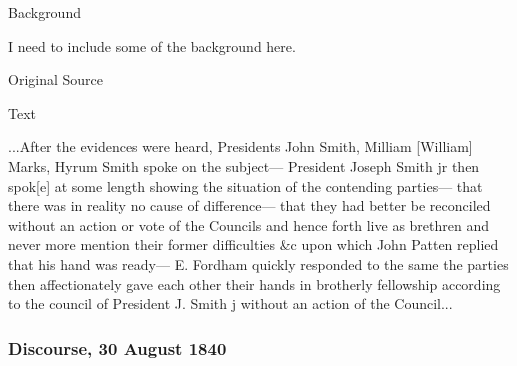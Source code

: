 			\begin{description}
				\item[Background]
			\end{description}
			
				I need to include some of the background here.
			
			
			\begin{description}
				\item[Original Source]
			\end{description}
			
			
			\begin{description}
				\item[Text]
			\end{description}
			
				...After the evidences were heard, Presidents John Smith, Milliam [William] Marks, Hyrum Smith spoke on the subject--- President Joseph Smith jr then spok[e] at some length showing the situation of the contending parties--- that there was in reality no cause of difference--- that they had better be reconciled without an action or vote of the Councils and hence forth live as brethren and never more mention their former difficulties \&c upon which John Patten replied that his hand was ready--- E. Fordham quickly responded to the same the parties then affectionately gave each other their hands in brotherly fellowship according to the council of President J. Smith j without an action of the Council...
				
		\subsubsection{Discourse, 30 August 1840}
			\label{EMS-1840-JS-30-AUG-1840}
			
